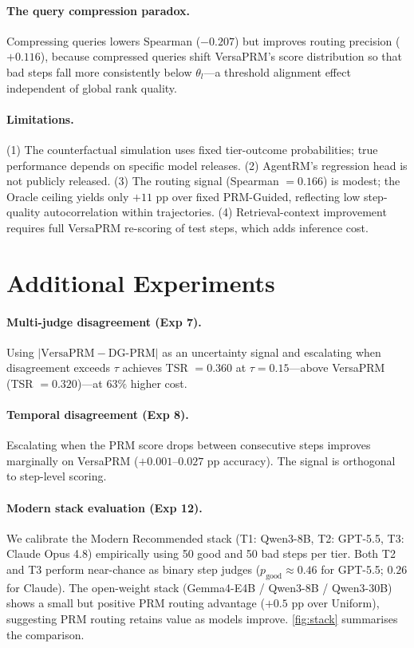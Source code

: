 \documentclass[sigconf,natbib=false]{acmart}
\begin{document}
\paragraph{The query compression paradox.}
Compressing queries lowers Spearman ($-0.207$) but improves routing precision
($+0.116$), because compressed queries shift VersaPRM's score distribution so
that bad steps fall more consistently below $\theta_l$---a threshold alignment
effect independent of global rank quality.

\paragraph{Limitations.}
(1) The counterfactual simulation uses fixed tier-outcome probabilities; true
performance depends on specific model releases.
(2) AgentRM's regression head is not publicly released.
(3) The routing signal (Spearman $= 0.166$) is modest; the Oracle ceiling
yields only $+11$ pp over fixed PRM-Guided, reflecting low step-quality
autocorrelation within trajectories.
(4) Retrieval-context improvement requires full VersaPRM re-scoring of test
steps, which adds inference cost.

\section{Additional Experiments}
\label{sec:additional}

\paragraph{Multi-judge disagreement (Exp 7).}
Using $|\text{VersaPRM} - \text{DG-PRM}|$ as an uncertainty signal and
escalating when disagreement exceeds $\tau$ achieves TSR $= 0.360$
at $\tau = 0.15$---above VersaPRM (TSR $= 0.320$)---at $63\%$ higher cost.

\paragraph{Temporal disagreement (Exp 8).}
Escalating when the PRM score drops between consecutive steps improves
marginally on VersaPRM ($+0.001$--$0.027$ pp accuracy).  The signal is
orthogonal to step-level scoring.

\paragraph{Modern stack evaluation (Exp 12).}
We calibrate the Modern Recommended stack (T1: Qwen3-8B, T2: GPT-5.5,
T3: Claude Opus 4.8) empirically using 50 good and 50 bad steps per tier.
Both T2 and T3 perform near-chance as binary step judges ($p_\text{good}
\approx 0.46$ for GPT-5.5; $0.26$ for Claude).  The open-weight stack
(Gemma4-E4B / Qwen3-8B / Qwen3-30B) shows a small but positive PRM routing
advantage ($+0.5$ pp over Uniform), suggesting PRM routing retains value as
models improve.  \cref{fig:stack} summarises the comparison.
\end{document}
